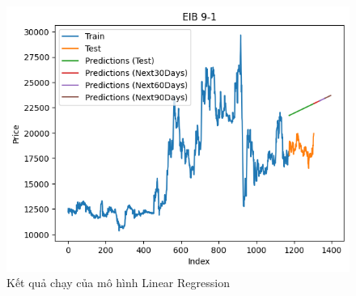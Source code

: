 \begin{figure}[H]
\begin{minipage}{0.15\textwidth}
    \includegraphics[width=1\textwidth]{resources/chapter-5/newdata1/result/EIB_LinearRegression_9-1.png}
    \end{minipage}
    \hfill
    
    \caption{Kết quả chạy của mô hình Linear Regression}
    \label{fig:linear_regression_result}
\end{figure}

